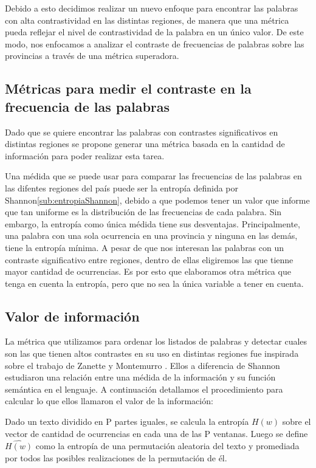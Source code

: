 Debido a esto decidimos realizar un nuevo enfoque para encontrar las palabras con alta contrastividad en las distintas regiones, de manera que una métrica pueda reflejar el nivel de contrastividad de la palabra en un único valor.
De este modo, nos enfocamos a analizar el contraste de frecuencias de palabras sobre las provincias a través de una métrica superadora.

\subsection{Métricas para medir el contraste en la frecuencia de las palabras}
Dado que se quiere encontrar las palabras con contrastes significativos en distintas 
regiones se propone generar una métrica basada en la cantidad de información 
para poder realizar esta tarea.

Una médida que se puede usar para comparar las frecuencias de las palabras en las difentes regiones del país puede ser la entropía definida por Shannon\ref{sub:entropiaShannon}, debido a que podemos tener un valor que informe que tan uniforme es la distribución de las frecuencias de cada palabra.
Sin embargo, la entropía como única médida tiene sus desventajas. Principalmente, una palabra con una sola ocurrencia en una provincia y ninguna en las demás, tiene la entropía mínima. A pesar de que nos interesan las palabras con un contraste significativo entre regiones, dentro de ellas eligiremos las que tienne mayor cantidad de ocurrencias. Es por esto que elaboramos otra métrica que tenga en cuenta la entropía, pero que no sea la única variable a tener en cuenta.


\subsection{Valor de información}
La métrica que utilizamos para ordenar los listados de palabras y detectar cuales son
las que tienen altos contrastes en su uso en distintas regiones fue inspirada sobre el
trabajo de Zanette y Montemurro \cite{montemurro2010towards}.
Ellos a diferencia de Shannon estudiaron una relación entre una médida de la información y su función semántica en el lenguaje.
A continuación detallamos el procedimiento para calcular lo que ellos llamaron
el valor de la información:

Dado un texto dividido en P partes iguales, se calcula la entropía  $H(w)$ sobre el vector de cantidad de ocurrencias en cada una de las P ventanas.
Luego se define $\widehat{H(w)}$  como la entropía de una permutación aleatoria del texto y promediada por todos las posibles realizaciones de la permutación de él. 

